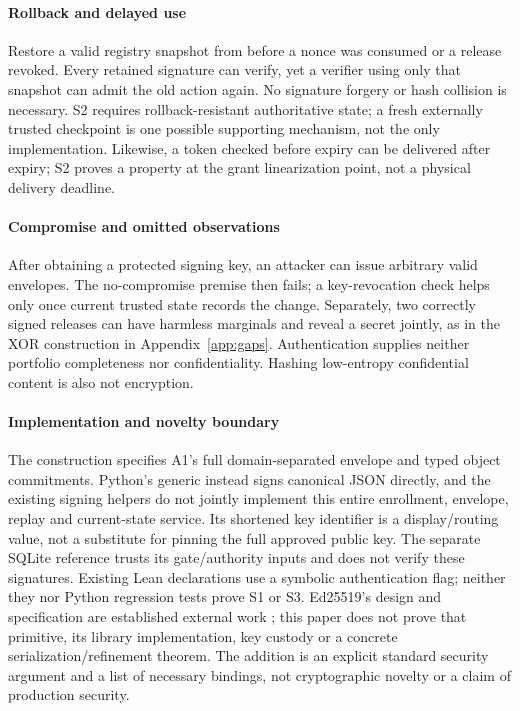 \paragraph{Rollback and delayed use}
Restore a valid registry snapshot from before a nonce was consumed or a
release revoked. Every retained signature can verify, yet a verifier using
only that snapshot can admit the old action again. No signature forgery or
hash collision is necessary. S2 requires rollback-resistant authoritative
state; a fresh externally trusted checkpoint is one possible supporting
mechanism, not the only implementation. Likewise, a token checked before
expiry can be delivered after expiry; S2 proves a property at the grant
linearization point, not a physical delivery deadline.

\paragraph{Compromise and omitted observations}
After obtaining a protected signing key, an attacker can issue arbitrary
valid envelopes. The no-compromise premise then fails; a key-revocation
check helps only once current trusted state records the change.
Separately, two correctly signed releases can have harmless marginals and
reveal a secret jointly, as in the XOR construction in Appendix~\ref{app:gaps}.
Authentication supplies neither portfolio completeness nor confidentiality.
Hashing low-entropy confidential content is also not encryption.

\paragraph{Implementation and novelty boundary}
The construction specifies A1's full domain-separated envelope and typed
object commitments. Python's generic  instead signs
canonical JSON directly, and the existing signing helpers do not jointly
implement this entire enrollment, envelope, replay and current-state service.
Its shortened key identifier is a display/routing value, not a substitute
for pinning the full approved public key. The separate SQLite reference
trusts its gate/authority inputs and does not verify these signatures.
Existing Lean declarations use a symbolic authentication flag; neither
they nor Python regression tests prove S1 or S3. Ed25519's design and
specification are established external work
\citep{bernstein2012signatures,rfc8032}; this paper does not prove that
primitive, its library implementation, key custody or a concrete
serialization/refinement theorem. The addition is an explicit standard
security argument and a list of necessary bindings, not cryptographic
novelty or a claim of production security.

